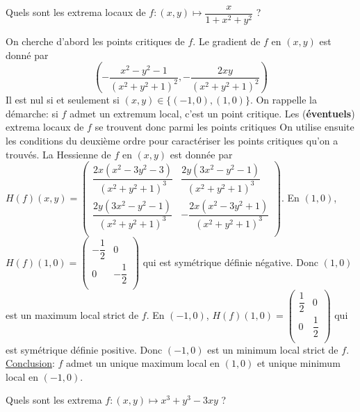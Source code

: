 \documentclass{fancybook}
\begin{document}
\begin{exercice}
Quels sont les extrema locaux de $\displaystyle f:(x,y)\mapsto \dfrac{x}{1+x^2+y^2}$ ?
\end{exercice}
On cherche d'abord les points critiques de $f$. Le gradient de $f$ en $(x,y)$ est donné par $$\left(-\dfrac{x^2-y^2-1}{\left(x^2+y^2+1\right)^2},-\dfrac{2 x y}{\left(x^2+y^2+1\right)^2}\right)$$ Il est nul si et seulement si $(x,y)\in \{(-1,0),(1,0)\}$.\newline 
\newline
On rappelle la démarche: si $f$ admet un extremum local, c'est un point critique. Les (\textbf{éventuels}) extrema locaux de $f$ se trouvent donc parmi les points critiques On utilise ensuite les conditions du deuxième ordre pour caractériser les points critiques qu'on a trouvés. \newline 
\newline
La Hessienne de $f$ en $(x,y)$ est donnée par $H(f)(x,y)= \left(
\begin{array}{cc}
 \dfrac{2 x \left(x^2-3 y^2-3\right)}{\left(x^2+y^2+1\right)^3} & \dfrac{2 y \left(3 x^2-y^2-1\right)}{\left(x^2+y^2+1\right)^3} \\
 \dfrac{2 y \left(3 x^2-y^2-1\right)}{\left(x^2+y^2+1\right)^3} & -\dfrac{2 x \left(x^2-3 y^2+1\right)}{\left(x^2+y^2+1\right)^3} \\
\end{array}
\right)$.\newline
En $(1,0)$, $H(f)(1,0)=\left(
\begin{array}{cc}
 -\dfrac{1}{2} & 0 \\
 0 & -\dfrac{1}{2} \\
\end{array}
\right)$ qui est symétrique définie négative. Donc $(1,0)$ est un maximum local strict de $f$.\newline
En $(-1,0)$, $H(f)(1,0)=\left(
\begin{array}{cc}
 \dfrac{1}{2} & 0 \\
 0 & \dfrac{1}{2} \\
\end{array}
\right)$ qui est symétrique définie positive. Donc $(-1,0)$ est un minimum local strict de $f$.\newline
\newline
\underline{Conclusion}: $f$ admet un unique maximum local en $(1,0)$ et unique minimum local en $(-1,0)$.

\begin{exercice}
Quels sont les extrema $\displaystyle f:(x,y)\mapsto x^3+y^3-3xy$ ?
\end{exercice}
\end{document}

